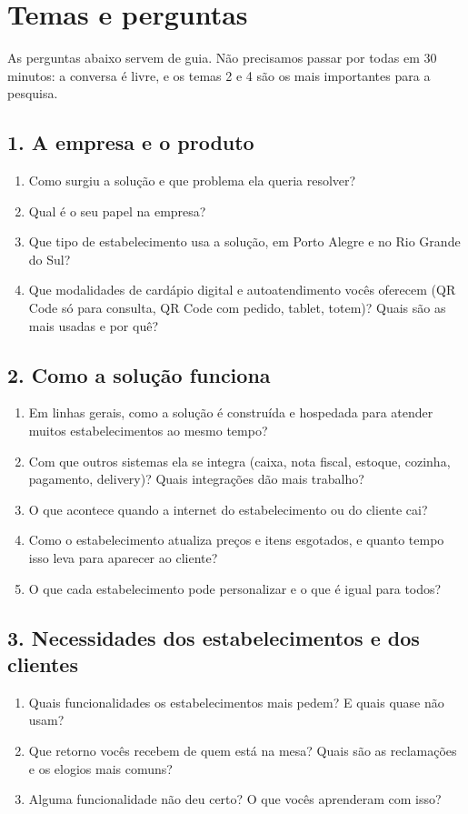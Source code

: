 \documentclass[11pt,a4paper]{article}
\newcommand{\tema}[1]{\subsection*{\normalsize #1}}
\begin{document}
\section*{\normalsize Temas e perguntas}

As perguntas abaixo servem de guia. Não precisamos passar por todas em 30 minutos: a conversa é livre, e os temas 2 e 4 são os mais importantes para a pesquisa.

\tema{1. A empresa e o produto}
\begin{enumerate}
  \item Como surgiu a solução e que problema ela queria resolver?
  \item Qual é o seu papel na empresa?
  \item Que tipo de estabelecimento usa a solução, em Porto Alegre e no Rio Grande do Sul?
  \item Que modalidades de cardápio digital e autoatendimento vocês oferecem (QR Code só para consulta, QR Code com pedido, tablet, totem)? Quais são as mais usadas e por quê?
\end{enumerate}

\tema{2. Como a solução funciona}
\begin{enumerate}[resume]
  \item Em linhas gerais, como a solução é construída e hospedada para atender muitos estabelecimentos ao mesmo tempo?
  \item Com que outros sistemas ela se integra (caixa, nota fiscal, estoque, cozinha, pagamento, delivery)? Quais integrações dão mais trabalho?
  \item O que acontece quando a internet do estabelecimento ou do cliente cai?
  \item Como o estabelecimento atualiza preços e itens esgotados, e quanto tempo isso leva para aparecer ao cliente?
  \item O que cada estabelecimento pode personalizar e o que é igual para todos?
\end{enumerate}

\tema{3. Necessidades dos estabelecimentos e dos clientes}
\begin{enumerate}[resume]
  \item Quais funcionalidades os estabelecimentos mais pedem? E quais quase não usam?
  \item Que retorno vocês recebem de quem está na mesa? Quais são as reclamações e os elogios mais comuns?
  \item Alguma funcionalidade não deu certo? O que vocês aprenderam com isso?
\end{enumerate}
\end{document}
